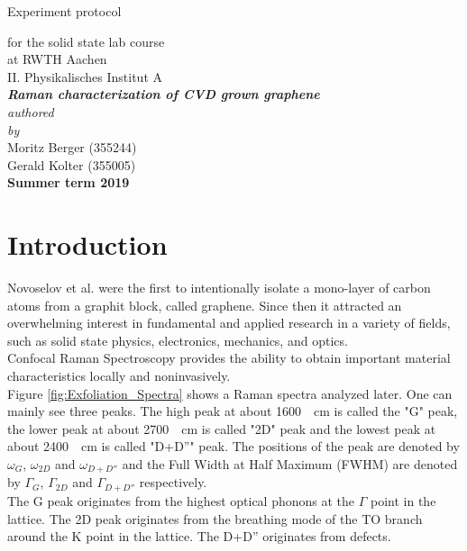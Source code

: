 \documentclass[12pt,a4paper]{article}
\author{Gerald}
\begin{document}
	\setlength{\parindent}{0pt} 
	\begin{center}
		{\LARGE Experiment protocol}\\
		\begin{large}
			for the solid state lab course\\[0.4cm]
			at RWTH Aachen\\
			II. Physikalisches Institut A\\[5.5cm]
			\Large\textbf{\textsl{Raman characterization of CVD grown graphene}}\\[5.5cm]
			\normalsize\textit{authored\\by}\\[0.4cm]
			\large{Moritz Berger (355244)\\Gerald Kolter (355005)}\\[2cm]
			\large \textbf{Summer term 2019}
		\end{large}
	\end{center}
	\newpage
	
	\tableofcontents
	\newpage

\section{Introduction}
Novoselov et al. were the first to intentionally isolate a mono-layer of carbon atoms from a graphit block, called graphene.\cite{Novoselov2004} Since then it attracted an overwhelming interest in fundamental and applied research in a variety of fields, such as solid state physics, electronics, mechanics, and optics.\cite{NeumannStampfer} \\
Confocal Raman Spectroscopy provides the ability to obtain important material characteristics locally and noninvasively.\cite{NeumannStampfer} \\
Figure \ref{fig:Exfoliation_Spectra} shows a Raman spectra analyzed later. One can mainly see three peaks. The high peak at about \SI{1600}{\per cm} is called the "G" peak, the lower peak at about \SI{2700}{\per cm} is called "2D" peak and the lowest peak at about \SI{2400}{\per cm} is called "D+D''" peak. The positions of the peak are denoted by $\omega _G$, $\omega _{2D}$ and $\omega _{D+D''}$ and the Full Width at Half Maximum (FWHM) are denoted by $\Gamma _G$, $\Gamma _{2D}$ and $\Gamma _{D+D''}$ respectively. \\
The G peak originates from the highest optical phonons at the $\Gamma$ point in the lattice. The 2D peak originates from the breathing mode of the TO branch around the K point in the lattice. The D+D'' originates from defects.\cite{NeumannStampfer}
\end{document}
